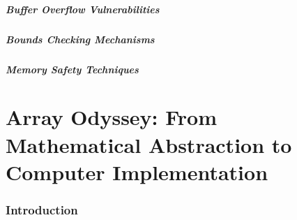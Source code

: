\documentclass[12pt, oneside]{book}
\begin{document}
\subsubsection{Buffer Overflow Vulnerabilities}
\subsubsection{Bounds Checking Mechanisms}
\subsubsection{Memory Safety Techniques}
	
\part{Array Odyssey: From Mathematical Abstraction to Computer Implementation}

\section*{Introduction}
\end{document}
